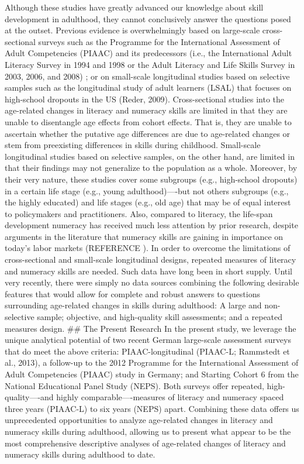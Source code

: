 \documentclass[
  english,
  man]{apa6}
\begin{document}
Although these studies have greatly advanced our knowledge about skill development in adulthood, they cannot conclusively answer the questions posed at the outset. Previous evidence is overwhelmingly based on large-scale cross-sectional surveys such as the Programme for the International Assessment of Adult Competencies (PIAAC) and its predecessors (i.e., the International Adult Literacy Survey in 1994 and 1998 or the Adult Literacy and Life Skills Survey in 2003, 2006, and 2008) ; or on small-scale longitudinal studies based on selective samples such as the longitudinal study of adult learners (LSAL) that focuses on high-school dropouts in the US (Reder, 2009). Cross-sectional studies into the age-related changes in literacy and numeracy skills are limited in that they are unable to disentangle age effects from cohort effects. That is, they are unable to ascertain whether the putative age differences are due to age-related changes or stem from preexisting differences in skills during childhood. Small-scale longitudinal studies based on selective samples, on the other hand, are limited in that their findings may not generalize to the population as a whole. Moreover, by their very nature, these studies cover some subgroups (e.g., high-school dropouts) in a certain life stage (e.g., young adulthood)----but not others subgroups (e.g., the highly educated) and life stages (e.g., old age) that may be of equal interest to policymakers and practitioners. Also, compared to literacy, the life-span development numeracy has received much less attention by prior research, despite arguments in the literature that numeracy skills are gaining in importance on today's labor markets (REFERENCE ).
In order to overcome the limitations of cross-sectional and small-scale longitudinal designs, repeated measures of literacy and numeracy skills are needed. Such data have long been in short supply. Until very recently, there were simply no data sources combining the following desirable features that would allow for complete and robust answers to questions surrounding age-related changes in skills during adulthood: A large and non-selective sample; objective, and high-quality skill assessments; and a repeated measures design.
\#\# The Present Research
In the present study, we leverage the unique analytical potential of two recent German large-scale assessment surveys that do meet the above criteria: PIAAC-longitudinal (PIAAC-L; Rammstedt et al., 2013), a follow-up to the 2012 Programme for the International Assessment of Adult Competencies (PIAAC) study in Germany; and Starting Cohort 6 from the National Educational Panel Study (NEPS). Both surveys offer repeated, high-quality----and highly comparable----measures of literacy and numeracy spaced three years (PIAAC-L) to six years (NEPS) apart. Combining these data offers us unprecedented opportunities to analyze age-related changes in literacy and numeracy skills during adulthood, allowing us to present what appear to be the most comprehensive descriptive analyses of age-related changes of literacy and numeracy skills during adulthood to date.
\end{document}
